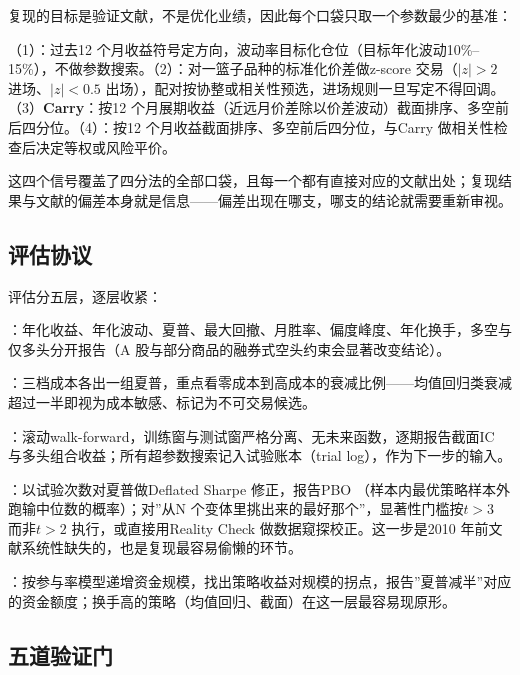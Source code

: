\documentclass[12pt,a4paper]{ctexart}
\begin{document}
复现的目标是验证文献，不是优化业绩，因此每个口袋只取一个参数最少的基准：


（1）：过去12 个月收益符号定方向\cite{03}，波动率目标化仓位（目标年化波动10\%–15\%）\cite{08}，不做参数搜索。（2）：对一篮子品种的标准化价差做z-score 交易（$|z| > 2$ 进场、$|z| < 0.5$ 出场），配对按协整或相关性预选\cite{28, 31}，进场规则一旦写定不得回调。（3）\textbf{Carry}：按12 个月展期收益（近远月价差除以价差波动）截面排序、多空前后四分位\cite{53, 58}。（4）：按12 个月收益截面排序、多空前后四分位\cite{03, 61}，与Carry 做相关性检查后决定等权或风险平价\cite{84}。


这四个信号覆盖了四分法的全部口袋，且每一个都有直接对应的文献出处；复现结果与文献的偏差本身就是信息——偏差出现在哪支，哪支的结论就需要重新审视。


\subsection{评估协议}

评估分五层，逐层收紧：


：年化收益、年化波动、夏普、最大回撤、月胜率、偏度峰度、年化换手，多空与仅多头分开报告（A 股与部分商品的融券式空头约束会显著改变结论）\cite{77}。


：三档成本各出一组夏普，重点看零成本到高成本的衰减比例——均值回归类衰减超过一半即视为成本敏感、标记为不可交易候选。


：滚动walk-forward，训练窗与测试窗严格分离、无未来函数，逐期报告截面IC 与多头组合收益；所有超参数搜索记入试验账本（trial log），作为下一步的输入。


：以试验次数对夏普做Deflated Sharpe 修正\cite{86}，报告PBO （样本内最优策略样本外跑输中位数的概率）\cite{87}；对”\hspace{0.3em}从N 个变体里挑出来的最好那个”，显著性门槛按$t > 3$ 而非$t > 2$ 执行\cite{46}，或直接用Reality Check 做数据窥探校正\cite{45}。这一步是2010 年前文献系统性缺失的\cite{36}，也是复现最容易偷懒的环节。


：按参与率模型递增资金规模，找出策略收益对规模的拐点，报告”\hspace{0.3em}夏普减半”\hspace{0.3em}对应的资金额度；换手高的策略（均值回归、截面）在这一层最容易现原形\cite{20}。


\subsection{五道验证门}
\end{document}
